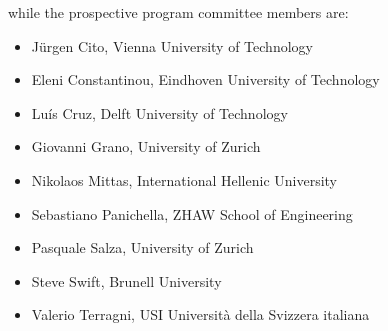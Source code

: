 \smallskip
\noindent while the prospective program committee members are:
\begin{itemize}[topsep=0.5em, itemsep=0.5em]
  \item Jürgen Cito, Vienna University of Technology
  \item Eleni Constantinou, Eindhoven University of Technology
  \item Luís Cruz, Delft University of Technology
  \item Giovanni Grano, University of Zurich
  \item Nikolaos Mittas, International Hellenic University
  \item Sebastiano Panichella, ZHAW School of Engineering
  \item Pasquale Salza, University of Zurich
  \item Steve Swift, Brunell University
  \item Valerio Terragni, USI Università della Svizzera italiana
\end{itemize}
